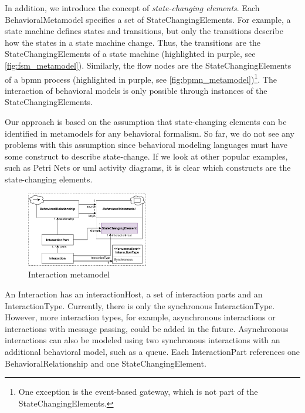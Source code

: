 \documentclass{jot}
\begin{document}
In addition, we introduce the concept of \emph{state-changing elements}.
Each \textsf{BehavioralMetamodel} specifies a set of \textsf{StateChangingElement}s.
For example, a state machine defines states and transitions, but only the transitions describe how the states in a state machine change.
Thus, the transitions are the \textsf{StateChangingElement}s of a state machine (highlighted in purple, see \autoref{fig:fsm_metamodel}).
Similarly, the flow nodes are the \textsf{StateChangingElement}s of a \gls*{bpmn} process (highlighted in purple, see \autoref{fig:bpmn_metamodel})\footnote{One exception is the event-based gateway, which is not part of the \textsf{StateChangingElement}s.}.
The interaction of behavioral models is only possible through instances of the \textsf{StateChangingElement}s.

Our approach is based on the assumption that state-changing elements can be identified in metamodels for any behavioral formalism.
So far, we do not see any problems with this assumption since behavioral modeling languages must have some construct to describe state-change.
If we look at other popular examples, such as Petri Nets or \gls*{uml} activity diagrams, it is clear which constructs are the state-changing elements. 

\begin{figure}[h]
    \centering
    \includegraphics[width=0.475\textwidth]{figures/interaction_metamodel.pdf}
    \caption{Interaction metamodel}
    \label{fig:interaction_metamodel}
\end{figure}

An \textsf{Interaction} has an \textsf{interactionHost}, a set of interaction \textsf{parts} and an \textsf{InteractionType}.
Currently, there is only the \textsf{synchronous} \textsf{InteractionType}.
However, more interaction types, for example, asynchronous interactions or interactions with message passing, could be added in the future.
Asynchronous interactions can also be modeled using two synchronous interactions with an additional behavioral model, such as a queue.
Each \textsf{InteractionPart} references one \textsf{BehavioralRelationship} and one \textsf{StateChangingElement}.
\end{document}
